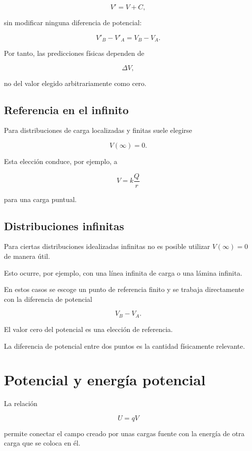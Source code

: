 \[
V'=V+C,
\]

sin modificar ninguna diferencia de potencial:

\[
V'_B-V'_A
=
V_B-V_A.
\]

Por tanto, las predicciones físicas dependen de

\[
\Delta V,
\]

no del valor elegido arbitrariamente como cero.


\subsection{Referencia en el infinito}

Para distribuciones de carga localizadas y finitas suele elegirse

\[
\boxed{
V(\infty)=0
}.
\]

Esta elección conduce, por ejemplo, a

\[
V=k\frac{Q}{r}
\]

para una carga puntual.


\subsection{Distribuciones infinitas}

Para ciertas distribuciones idealizadas infinitas no es posible utilizar
\(V(\infty)=0\) de manera útil.

Esto ocurre, por ejemplo, con una línea infinita de carga o una lámina infinita.

En estos casos se escoge un punto de referencia finito y se trabaja directamente con
la diferencia de potencial

\[
V_B-V_A.
\]

\begin{idea}

El valor cero del potencial es una elección de referencia.

La diferencia de potencial entre dos puntos es la cantidad físicamente relevante.

\end{idea}


\section{Potencial y energía potencial}

La relación

\[
U=qV
\]

permite conectar el campo creado por unas cargas fuente con la energía de otra carga
que se coloca en él.

